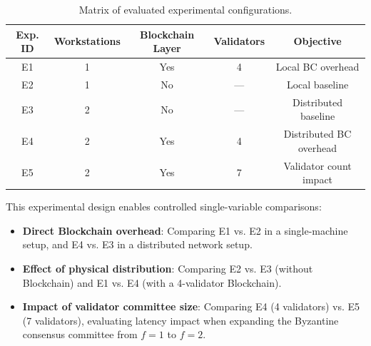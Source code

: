 \begin{table}[htbp]
\caption{Matrix of evaluated experimental configurations.}\label{tab:configuraciones}
\begin{tabular*}{\textwidth}{@{\extracolsep\fill}ccccc}
\toprule
\textbf{Exp. ID} & \textbf{Workstations} & \textbf{Blockchain Layer} & \textbf{Validators} & \textbf{Objective} \\
\midrule
E1 & 1 & Yes & 4 & Local BC overhead \\
E2 & 1 & No & --- & Local baseline \\
E3 & 2 & No & --- & Distributed baseline \\
E4 & 2 & Yes & 4 & Distributed BC overhead \\
E5 & 2 & Yes & 7 & Validator count impact \\
\bottomrule
\end{tabular*}
\end{table}

This experimental design enables controlled single-variable comparisons:
\begin{itemize}
    \item \textbf{Direct Blockchain overhead}: Comparing E1 vs. E2 in a single-machine setup, and E4 vs. E3 in a distributed network setup.
    \item \textbf{Effect of physical distribution}: Comparing E2 vs. E3 (without Blockchain) and E1 vs. E4 (with a 4-validator Blockchain).
    \item \textbf{Impact of validator committee size}: Comparing E4 (4 validators) vs. E5 (7 validators), evaluating latency impact when expanding the Byzantine consensus committee from $f=1$ to $f=2$.
\end{itemize}
